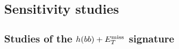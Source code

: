 \subsection{Sensitivity studies}

%
%
%
%
%
%
%
%
%
%
%

\subsubsection{Studies of the $h(bb)+E_T^\mathrm{miss}$ signature}


\FloatBarrier
